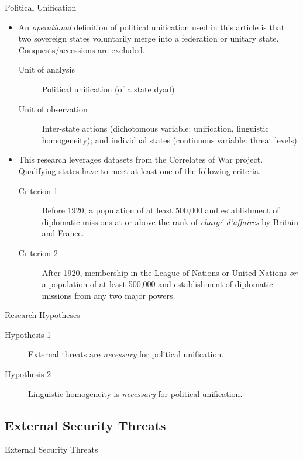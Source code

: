 \documentclass{beamer}
\begin{document}
	\begin{frame}{Political Unification}
		\begin{itemize}
			\item An \textit{operational} definition of political unification used in this article is that two sovereign states voluntarily merge into a federation or unitary state. Conquests/accessions are excluded.
			\begin{description}
				\item[Unit of analysis] Political unification (of a state dyad)
				\item[Unit of observation] Inter-state actions (dichotomous variable: unification, linguistic homogeneity); and individual states (continuous variable: threat levels)
			\end{description}
		\end{itemize}

		\begin{itemize}
			\item This research leverages datasets from the Correlates of War project. Qualifying states have to meet at least one of the following criteria.
			\begin{description}
				\item[Criterion 1] Before 1920, a population of at least 500,000 and establishment of diplomatic missions at or above the rank of \textit{chargé d'affaires} by Britain and France.
				\item[Criterion 2] After 1920, membership in the League of Nations or United Nations \textit{or} a population of at least 500,000 and establishment of diplomatic missions from any two major powers.
			\end{description}
		\end{itemize}
	\end{frame}

	\begin{frame}{Research Hypotheses}
		\begin{description}
			\item[Hypothesis 1] External threats are \textit{necessary} for political unification.
			\item[Hypothesis 2] Linguistic homogeneity is \textit{necessary} for political unification.
		\end{description}
	\end{frame}



	\subsection{External Security Threats}
	\begin{frame}{External Security Threats}

	\end{frame}
\end{document}
